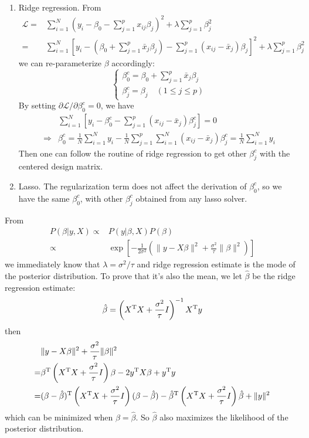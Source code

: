 \begin{sol}
\begin{enumerate}
\item Ridge regression. From
\begin{align*}
\mathcal{L} =& \sum_{i=1}^{N}\left(y_i-\beta_0-\sum_{j=1}^{p}x_{ij}\beta_j\right)^2+\lambda\sum_{j=1}^{p}\beta_j^2\\
=& \sum_{i=1}^{N}\left[y_i-\left(\beta_0+\sum_{j=1}^{p}\bar{x}_j\beta_j\right)-\sum_{j=1}^{p}\left(x_{ij}-\bar{x}_j\right)\beta_j\right]^2+\lambda\sum_{j=1}^{p}\beta_j^2
\end{align*}
we can re-parameterize $\beta$ accordingly:
\[
\begin{cases}
\beta_0^c=\beta_0+\sum_{j=1}^{p}\bar{x}_j\beta_j\\
\beta_j^c=\beta_j\quad(1\le j\le p)
\end{cases}
\]
By setting $\partial \mathcal{L}/\partial \beta^c_0=0$, we have
\begin{align*}
& \sum_{i=1}^{N}\left[y_i-\beta_0^c-\sum_{j=1}^{p}\left(x_{ij}-\bar{x}_j\right)\beta^c_j\right]=0\\
\Longrightarrow & \beta_0^c=\frac{1}{N}\sum_{i=1}^{N}y_i-\frac{1}{N}\sum_{j=1}^{p}\sum_{i=1}^{N}\left(x_{ij}-\bar{x}_j\right)\beta^c_j=\frac{1}{N}\sum_{i=1}^{N}y_i
\end{align*}
Then one can follow the routine of ridge regression to get other $\beta_j^c$ with the centered design matrix.
\item Lasso. The regularization term does not affect the derivation of $\beta_0^c$, so we have the same $\beta_0^c$, with other $\beta_j^c$ obtained from any lasso solver.
\end{enumerate}
\end{sol}

\begin{sol}
From
\begin{align*}
P(\beta\vert y,X) \propto & P(y\vert\beta,X)P(\beta)\\
\propto& \exp\left[-\frac{1}{2\sigma^2}\left(\|y-X\beta\|^2+\frac{\sigma^2}{\tau}\|\beta\|^2\right)\right]
\end{align*}
we immediately know that $\lambda=\sigma^2/\tau$ and ridge regression estimate is the mode of the posterior distribution. To prove that it's also the mean, we let $\hat{\beta}$ be the ridge regression estimate:
\[
\hat{\beta}=\left(X^{\mathrm{T}}X+\frac{\sigma^2}{\tau}I\right)^{-1}X^{\mathrm{T}}y
\]
then
\begin{align*}
& \|y-X\beta\|^2+\frac{\sigma^2}{\tau}\|\beta\|^2 \\
=& \beta^{\mathrm{T}}\left(X^{\mathrm{T}}X+\frac{\sigma^2}{\tau}I\right)\beta - 2y^{\mathrm{T}}X\beta + y^{\mathrm{T}}y\\
=& (\beta-\hat{\beta})^{\mathrm{T}}\left(X^{\mathrm{T}}X+\frac{\sigma^2}{\tau}I\right)(\beta-\hat{\beta})-\hat{\beta}^{\mathrm{T}}\left(X^{\mathrm{T}}X+\frac{\sigma^2}{\tau}I\right)\hat{\beta}+\|y\|^2
\end{align*}
which can be minimized when $\beta=\hat{\beta}$. So $\hat{\beta}$ also maximizes the likelihood of the posterior distribution.
\end{sol}

